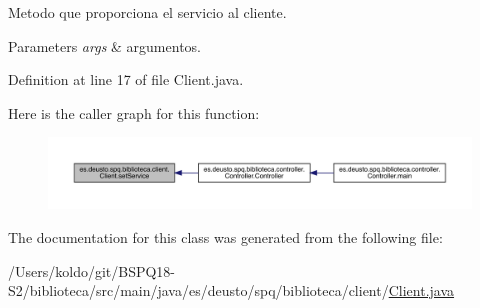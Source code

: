 Metodo que proporciona el servicio al cliente. 
\begin{DoxyParams}{Parameters}
{\em args} & argumentos. \\
\hline
\end{DoxyParams}


Definition at line 17 of file Client.\+java.

Here is the caller graph for this function\+:
\nopagebreak
\begin{figure}[H]
\begin{center}
\leavevmode
\includegraphics[width=350pt]{classes_1_1deusto_1_1spq_1_1biblioteca_1_1client_1_1_client_a96d3aee6ac3ad17ea896e4c50115bdf6_icgraph}
\end{center}
\end{figure}


The documentation for this class was generated from the following file\+:\begin{DoxyCompactItemize}
\item 
/\+Users/koldo/git/\+B\+S\+P\+Q18-\/\+S2/biblioteca/src/main/java/es/deusto/spq/biblioteca/client/\mbox{\hyperlink{_client_8java}{Client.\+java}}\end{DoxyCompactItemize}
